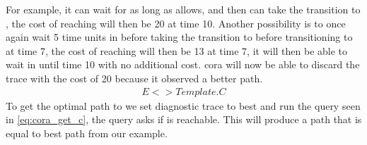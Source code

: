 For example, it can wait for as long as  allows, and then can take the transition to , the cost of reaching  will then be 20 at time 10.
Another possibility is to once again wait 5 time units in  before taking the transition to  before transitioning to  at time 7, the cost of reaching  will then be 13 at time 7, it will then be able to wait in  until time 10 with no additional cost.
\gls{cora} will now be able to discard the trace with the cost of 20 because it observed a better path.
\begin{align}
E<> Template.C
\label{eq:cora_get_c}
\end{align}
To get the optimal path to  we set diagnostic trace to best and run the query seen in \cref{eq:cora_get_c}, the query asks if  is reachable.
This will produce a path that is equal to best path from our example.
